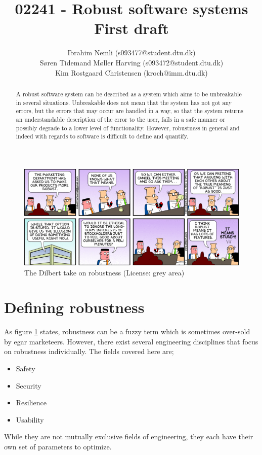 \documentclass[10pt,a4paper]{article}
\begin{document}
\author{
  Ibrahim Nemli (s093477@student.dtu.dk)\\
  Søren Tidemand Møller Harving (s093472@student.dtu.dk) \\
  Kim Rostgaard Christensen (kroch@imm.dtu.dk)
}
\title{02241 - Robust software systems \\
	First draft
}

\maketitle

\begin{abstract}
A robust software system can be described as a system which aims to be unbreakable in several situations. Unbreakable does not mean that the system has not got any errors, but the errors that may occur are handled in a way, so that the system returns an understandable description of the error to the user, fails in a safe manner or possibly degrade to a lower level of functionality. However, robustness in general and indeed with regards to software is difficult to define and quantify.
\end{abstract}

\tableofcontents

\begin{figure}[h]
\centering
\includegraphics[scale=0.4]{fig/dilbert_robust.png}
 \caption{The Dilbert take on robustness (License: grey area)}
 \label{fig:dilber_robustness}
\end{figure}

\newpage
\section{Defining robustness}
As figure \ref{fig:dilber_robustness} states, robustness can be a fuzzy term which is sometimes over-sold by egar marketeers.
However, there exist several engineering disciplines that focus on robustness individually. The fields covered here are;
\begin{itemize}
\item Safety
\item Security
\item Resilience
\item Usability
\end{itemize}
While they are not mutually exclusive fields of engineering, they each have their own set of parameters to optimize.
\end{document}
